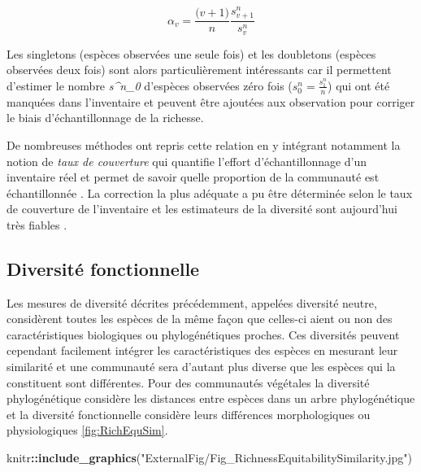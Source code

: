 \documentclass[
  11pt,
  french,
  A4paper,
  extrafontsizes,onecolumn,openright
  ]{memoir}
\newenvironment{Shaded}{\begin{snugshade}}{\end{snugshade}}
\newcommand{\KeywordTok}[1]{\textcolor[rgb]{0.13,0.29,0.53}{\textbf{#1}}}
\newcommand{\StringTok}[1]{\textcolor[rgb]{0.31,0.60,0.02}{#1}}
\newcommand{\OperatorTok}[1]{\textcolor[rgb]{0.81,0.36,0.00}{\textbf{#1}}}
\newcommand{\NormalTok}[1]{#1}
\begin{document}
\begin{equation}
\alpha_v=\frac{\big(v+1\big)}{n}\frac{s^n_{v+1}}{s^n_v}
\label{eq:formGoodTuring}
\end{equation}

Les singletons (espèces observées une seule fois) et les doubletons
(espèces observées deux fois) sont alors particulièrement intéressants
car il permettent d'estimer le nombre \emph{s\^{}n\_0} d'espèces
observées zéro fois (\(s^n_0=\frac{s^n_1}{n}\)) qui ont été manquées
dans l'inventaire et peuvent être ajoutées aux observation pour corriger
le biais d'échantillonnage de la richesse.

De nombreuses méthodes ont repris cette relation en y intégrant
notamment la notion de \emph{taux de couverture} qui quantifie l'effort
d'échantillonnage d'un inventaire réel et permet de savoir quelle
proportion de la communauté est échantillonnée \autocite{Dauby2012}. La
correction la plus adéquate a pu être déterminée selon le taux de
couverture de l'inventaire et les estimateurs de la diversité sont
aujourd'hui très fiables \autocites{Chao2015}{Marcon2015b}.

\subsection{Diversité fonctionnelle}\label{diversite-fonctionnelle}

Les mesures de diversité décrites précédemment, appelées diversité
neutre, considèrent toutes les espèces de la même façon que celles-ci
aient ou non des caractéristiques biologiques ou phylogénétiques
proches. Ces diversités peuvent cependant facilement intégrer les
caractéristiques des espèces en mesurant leur similarité et une
communauté sera d'autant plus diverse que les espèces qui la constituent
sont différentes. Pour des communautés végétales la diversité
phylogénétique considère les distances entre espèces dans un arbre
phylogénétique et la diversité fonctionnelle considère leurs différences
morphologiques ou physiologiques \ref{fig:RichEquSim}.

\begin{Shaded}
\begin{Highlighting}[]
\NormalTok{knitr}\OperatorTok{::}\KeywordTok{include_graphics}\NormalTok{(}\StringTok{"ExternalFig/Fig_RichnessEquitabilitySimilarity.jpg"}\NormalTok{)}
\end{Highlighting}
\end{Shaded}
\end{document}
